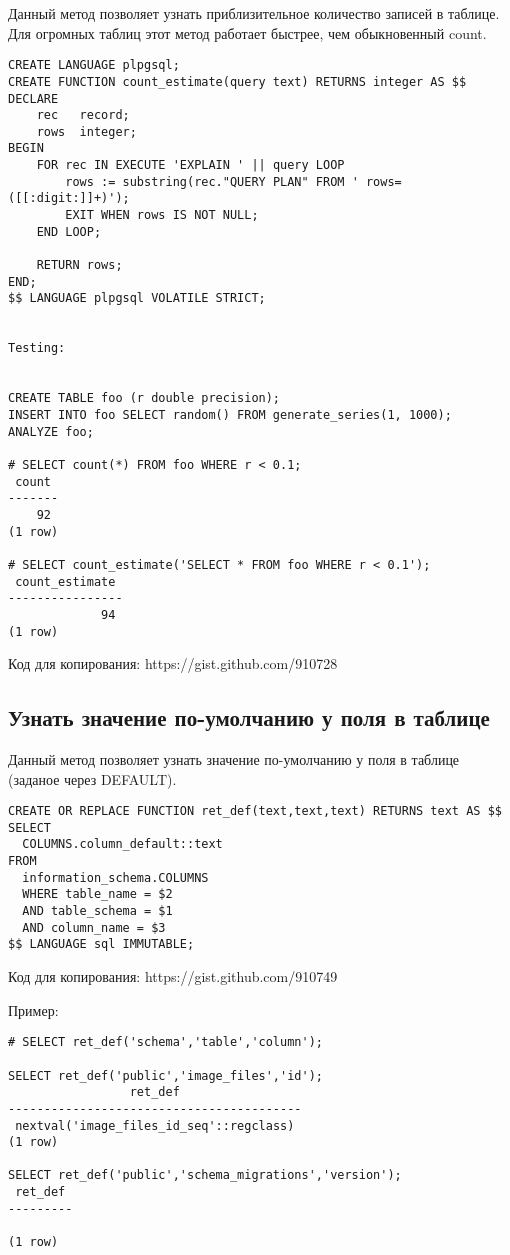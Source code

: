 \begin{framed}
Данный метод позволяет узнать приблизительное количество записей в таблице. 
Для огромных таблиц этот метод работает быстрее, чем обыкновенный count.
\end{framed}

\begin{lstlisting}[label=lst:snippets5,caption=<<Средний>> count. SQL запрос]
CREATE LANGUAGE plpgsql;
CREATE FUNCTION count_estimate(query text) RETURNS integer AS $$
DECLARE
    rec   record;
    rows  integer;
BEGIN
    FOR rec IN EXECUTE 'EXPLAIN ' || query LOOP
        rows := substring(rec."QUERY PLAN" FROM ' rows=([[:digit:]]+)');
        EXIT WHEN rows IS NOT NULL;
    END LOOP;
 
    RETURN rows;
END;
$$ LANGUAGE plpgsql VOLATILE STRICT;


Testing:


CREATE TABLE foo (r double precision);
INSERT INTO foo SELECT random() FROM generate_series(1, 1000);
ANALYZE foo;

# SELECT count(*) FROM foo WHERE r < 0.1;
 count 
-------
    92
(1 row)

# SELECT count_estimate('SELECT * FROM foo WHERE r < 0.1');
 count_estimate 
----------------
             94
(1 row)
\end{lstlisting}

Код для копирования: https://gist.github.com/910728


\subsection{Узнать значение по-умолчанию у поля в таблице}
\begin{framed}
Данный метод позволяет узнать значение по-умолчанию у поля в таблице (заданое через DEFAULT).
\end{framed}

\begin{lstlisting}[label=lst:snippets6,caption=Узнать значение по-умолчанию у поля в таблице. SQL запрос]
CREATE OR REPLACE FUNCTION ret_def(text,text,text) RETURNS text AS $$
SELECT 
  COLUMNS.column_default::text
FROM 
  information_schema.COLUMNS
  WHERE table_name = $2
  AND table_schema = $1
  AND column_name = $3
$$ LANGUAGE sql IMMUTABLE;
\end{lstlisting}

Код для копирования: https://gist.github.com/910749

Пример:
\begin{lstlisting}[label=lst:snippets7,caption=Узнать значение по-умолчанию у поля в таблице. Пример]
# SELECT ret_def('schema','table','column');

SELECT ret_def('public','image_files','id');
                 ret_def                 
-----------------------------------------
 nextval('image_files_id_seq'::regclass)
(1 row)

SELECT ret_def('public','schema_migrations','version');
 ret_def 
---------
 
(1 row)
\end{lstlisting}

